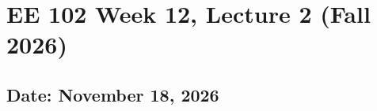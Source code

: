 \documentclass{ee102_notes}
\renewcommand{\releasedate}{November 18, 2026}
\begin{document}
\section*{EE 102 Week 12, Lecture 2 (Fall 2026)}
\subsection*{Date: \releasedate}
\tableofcontents

\end{document}
